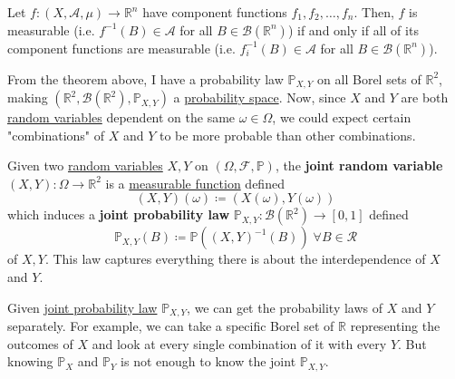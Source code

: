   \begin{theorem}
    \label{thm:measurability-via-component-functions}
    Let $f: (X, \mathcal{A}, \mu) \to \mathbb{R}^n$ have component functions $f_1, f_2, \ldots, f_n$. Then, $f$ is measurable (i.e. $f^{-1} (B) \in \mathcal{A}$ for all $B \in \mathcal{B}(\mathbb{R}^n)$) if and only if all of its component functions are measurable (i.e. $f_i^{-1} (B) \in \mathcal{A}$ for all $B \in \mathcal{B}(\mathbb{R}^n)$). 
  \end{theorem}

  From the theorem above, I have a probability law $\mathbb{P}_{X, Y}$ on all Borel sets of $\mathbb{R}^2$, making $(\mathbb{R}^2, \mathcal{B}(\mathbb{R}^2), \mathbb{P}_{X, Y})$ a \hyperref[def:probability-space]{probability space}. Now, since $X$ and $Y$ are both \hyperref[def:random-variable]{random variables} dependent on the same $\omega \in \Omega$, we could expect certain "combinations" of $X$ and $Y$ to be more probable than other combinations. 

  \begin{definition}
    \label{def:joint-probability-law}
    Given two \hyperref[def:random-variable]{random variables} $X, Y$ on $(\Omega, \mathcal{F}, \mathbb{P})$, the \textbf{joint random variable} $(X, Y): \Omega \to \mathbb{R}^2$ is a \hyperref[mt-def:measurable-function]{measurable function} defined 
    \begin{equation}
      (X, Y) (\omega) \coloneqq (X(\omega), Y(\omega))
    \end{equation}
    which induces a \textbf{joint probability law} $\mathbb{P}_{X, Y}: \mathcal{B}(\mathbb{R}^2) \to [0, 1]$ defined 
    \begin{equation}
      \mathbb{P}_{X, Y}(B) \coloneqq \mathbb{P}((X, Y)^{-1}(B)) \; \forall B \in \mathcal{R}
    \end{equation}
    of $X, Y$. This law captures everything there is about the interdependence of $X$ and $Y$. 
  \end{definition}

  Given \hyperref[def:joint-probability-law]{joint probability law} $\mathbb{P}_{X, Y}$, we can get the probability laws of $X$ and $Y$ separately. For example, we can take a specific Borel set of $\mathbb{R}$ representing the outcomes of $X$ and look at every single combination of it with every $Y$. But knowing $\mathbb{P}_X$ and $\mathbb{P}_Y$ is not enough to know the joint $\mathbb{P}_{X, Y}$. 

